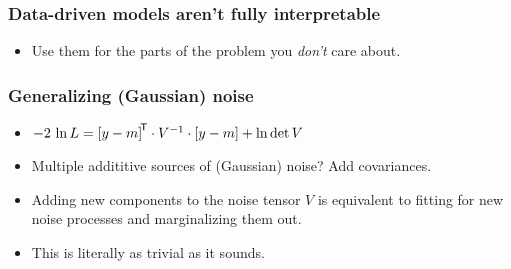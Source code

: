 \documentclass[pdftex]{beamer}
\begin{document}
\begin{frame}
  \frametitle{Data-driven models aren't fully interpretable}
  \begin{itemize}
  \item Use them for the parts of the problem you \emph{don't} care about.
  \end{itemize}
\end{frame}

\begin{frame}
  \frametitle{Generalizing (Gaussian) noise}
  \begin{itemize}
  \item $-2\,\ln L = {[y - m]}^{\mathsf{\!T}}\cdot V^{-1}\cdot [y - m] + \ln\det V$
  \item Multiple addititive sources of (Gaussian) noise? Add covariances.
  \item Adding new components to the noise tensor $V$ is
    equivalent to fitting for new noise processes and marginalizing
    them out.
  \item This is literally as trivial as it sounds.
  \end{itemize}
\end{frame}
\end{document}
